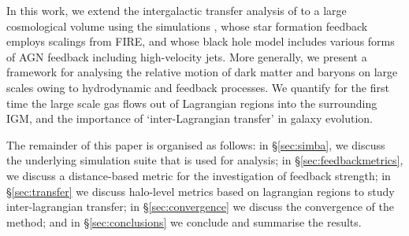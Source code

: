 In this work, we extend the intergalactic transfer analysis of
\citet{AnglesAlcazar2017} to a large cosmological volume using the \simba{}
simulations \citep{Dave2019}, whose star formation feedback employs scalings
from FIRE, and whose black hole model includes various forms of AGN feedback
including high-velocity jets. More generally, we present a framework for
analysing the relative motion of dark matter and baryons on large scales
owing to hydrodynamic and feedback processes. We quantify for the first time
the large scale gas flows out of Lagrangian regions into the surrounding IGM,
and the importance of `inter-Lagrangian transfer' in galaxy evolution.

The remainder of this paper is organised as follows: in \S\ref{sec:simba}, we
discuss the underlying \simba{} simulation suite that is used for analysis;
in \S\ref{sec:feedbackmetrics}, we discuss a distance-based metric for the
investigation of feedback strength; in \S\ref{sec:transfer} we discuss
halo-level metrics based on lagrangian regions to study inter-lagrangian
transfer; in \S\ref{sec:convergence} we discuss the convergence of the
method; and in \S\ref{sec:conclusions} we conclude and summarise the results.